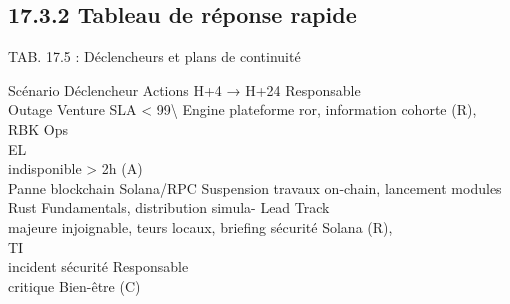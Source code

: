 \documentclass[12pt,landscape,a4paper]{article}
\begin{document}
\subsection{17.3.2 Tableau de réponse rapide}
\vspace{0.5em}
\begin{center}\begin{tabular}TAB. 17.5 : Déclencheurs et plans de continuité\end{tabular}\end{center}
\vspace{0.5em}
\vspace{0.5em}
Scénario           Déclencheur         Actions H+4 → H+24                                                                            Responsable\\
Outage Venture     SLA \textless{} 99\textbackslash{}%
Engine             plateforme          ror, information cohorte                                                                      (R), RBK Ops\\
\vspace{0.5em}
\vspace{0.5em}
\vspace{0.5em}
\vspace{0.5em}
EL\\
indisponible \textgreater{} 2h                                                                                                 (A)\\
Panne blockchain Solana/RPC            Suspension travaux on-chain, lancement modules Rust Fundamentals, distribution simula- Lead Track\\
majeure            injoignable,        teurs locaux, briefing sécurité                                                               Solana (R),\\
\vspace{0.5em}
\vspace{0.5em}
\vspace{0.5em}
\vspace{0.5em}
TI\\
incident sécurité                                                                                                 Responsable\\
critique                                                                                                          Bien-être (C)\\
\end{document}
